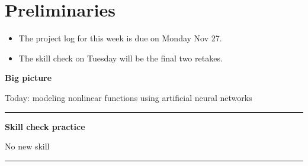 \documentclass[12pt,letterpaper,noanswers]{exam}
\begin{document}
 \pdfpageheight 11in 
  \pdfpagewidth 8.5in

\noindent 

\section*{Preliminaries}


\begin{itemize}
\itemsep0pt
\item The project log for this week is due on Monday Nov 27.
\item The skill check on Tuesday will be the final two retakes.
\end{itemize}


\noindent\textbf{Big picture}

Today: modeling nonlinear functions using artificial neural networks

\vspace{0.2cm}
\hrule
\vspace{0.2cm}

\noindent \textbf{Skill check practice}

No new skill


\vspace{0.2cm}
\hrule
\vspace{0.2cm}
\end{document}

